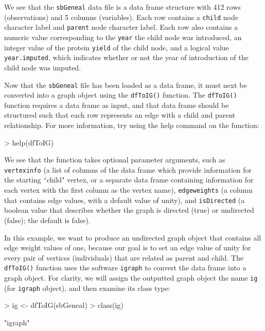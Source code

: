 \documentclass{article}
\numberwithin{equation}{section} %
\begin{document}
We see that the \texttt{sbGeneal} data file is a data frame structure with 412 rows (observations) and 5 columns (variables). Each row contains a \texttt{child} node character label and \texttt{parent} node character label. Each row also contains a numeric value corresponding to the \texttt{year} the child node was introduced, an integer value of the protein \texttt{yield} of the child node, and a logical value \texttt{year.imputed}, which indicates whether or not the year of introduction of the child node was imputed.

Now that the \texttt{sbGeneal} file has been loaded as a data frame, it must next be converted into a graph object using the \texttt{dfToIG()} function. The \texttt{dfToIG()} function requires a data frame as input, and that data frame should be structured such that each row represents an edge with a child and parent relationship. For more information, try using the help command on the function:

\begin{Schunk}
\begin{Sinput}
> help(dfToIG)
\end{Sinput}
\end{Schunk}

We see that the function takes optional parameter arguments, such as \texttt{vertexinfo} (a list of columns of the data frame which provide information for the starting ``child" vertex, or a separate data frame containing information for each vertex with the first column as the vertex name), \texttt{edgeweights} (a column that contains edge values, with a default value of unity), and \texttt{isDirected} (a boolean value that describes whether the graph is directed (true) or undirected (false); the default is false).

In this example, we want to produce an undirected graph object that contains all edge weight values of one, because our goal is to set an edge value of unity for every pair of vertices (individuals) that are related as parent and child. The \texttt{dfToIG()} function uses the software \texttt{igraph} to convert the data frame into a graph object. For clarity, we will assign the outputted graph object the name \texttt{ig} (for \texttt{igraph} object), and then examine its class type:

\begin{Schunk}
\begin{Sinput}
> ig <- dfToIG(sbGeneal)
> class(ig)
\end{Sinput}
\begin{Soutput}
[1] "igraph"
\end{Soutput}
\end{Schunk}
\end{document}

